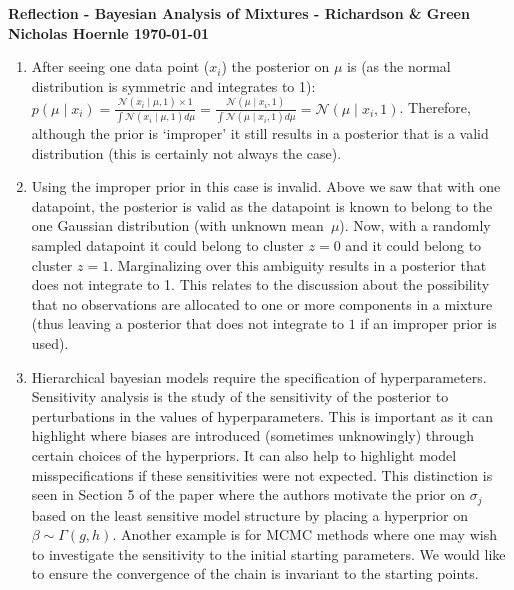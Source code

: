 \documentclass[twoside]{article}
\begin{document}
\textbf{Reflection - Bayesian Analysis of Mixtures - Richardson \& Green}\\
\textbf{Nicholas Hoernle \hfill \today}

\begin{enumerate}
\item After seeing one data point ($x_i$) the posterior on $\mu$ is (as the normal distribution is symmetric and integrates to 1):
$
  p(\mu \mid x_i) = \frac{\mathcal{N}(x_i \mid \mu, 1) \times 1}{\int \mathcal{N}(x_i \mid \mu, 1) d\mu} = \frac{\mathcal{N}(\mu \mid x_i, 1)}{\int \mathcal{N}(\mu \mid x_i, 1) d\mu} = \mathcal{N}(\mu \mid x_i, 1)
$. Therefore, although the prior is `improper' it still results in a posterior that is a valid distribution (this is certainly not always the case).

\item Using the improper prior in this case is invalid. Above we saw that with one datapoint, the posterior is valid as the datapoint is known to belong to the one Gaussian distribution (with unknown mean~$\mu$). Now, with a randomly sampled datapoint it could belong to cluster $z=0$ and it could belong to cluster $z=1$. Marginalizing over this ambiguity results in a posterior that does not integrate to 1. This relates to the discussion about the possibility that no observations are allocated to one or more components in a mixture (thus leaving a posterior that does not integrate to $1$ if an improper prior is used).

\item Hierarchical bayesian models require the specification of hyperparameters. Sensitivity analysis is the study of the sensitivity of the posterior to perturbations in the values of hyperparameters. This is important as it can highlight where biases are introduced (sometimes unknowingly) through certain choices of the hyperpriors. It can also help to highlight model misspecifications if these sensitivities were not expected. This distinction is seen in Section 5 of the paper where the authors motivate the prior on $\sigma_j$ based on the least sensitive model structure by placing a hyperprior on $\beta \sim \Gamma(g,h)$. Another example is for MCMC methods where one may wish to investigate the sensitivity to the initial starting parameters. We would like to ensure the convergence of the chain is invariant to the starting points.
\end{enumerate}
\end{document}
